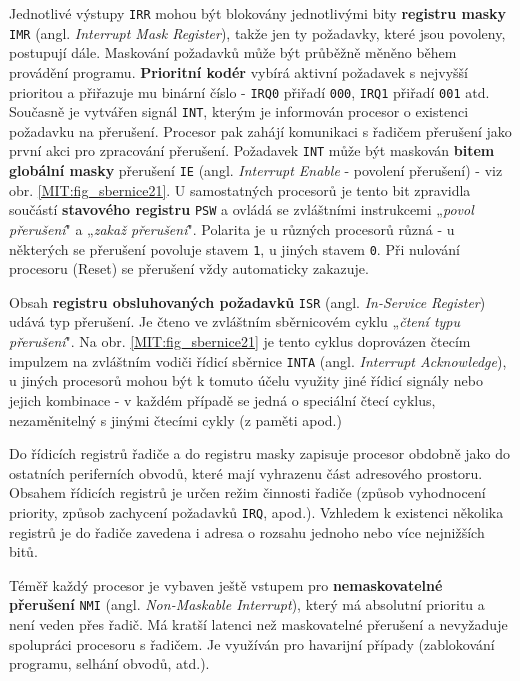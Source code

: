       Jednotlivé výstupy \texttt{IRR} mohou být blokovány jednotlivými bity \textbf{registru masky} 
      \texttt{IMR} (angl. \emph{Interrupt Mask Register}), takže jen ty požadavky, které jsou 
      povoleny, postupují dále. Maskování požadavků může být průběžně měněno během provádění 
      programu. \textbf{Prioritní kodér} vybírá aktivní požadavek s nejvyšší prioritou a přiřazuje 
      mu binární číslo - \texttt{IRQ0} přiřadí \texttt{000}, \texttt{IRQ1} přiřadí \texttt{001} 
      atd. Současně je vytvářen signál \texttt{INT}, kterým je informován procesor o existenci 
      požadavku na přerušení. Procesor pak zahájí komunikaci s řadičem přerušení jako první akci 
      pro zpracování přerušení. Požadavek \texttt{INT} může být maskován \textbf{bitem globální 
      masky} přerušení \texttt{IE} (angl. \emph{Interrupt Enable} - povolení přerušení) - viz obr. 
      \ref{MIT:fig_sbernice21}. U samostatných procesorů je tento bit zpravidla součástí 
      \textbf{stavového registru} \texttt{PSW} a ovládá se zvláštními instrukcemi „\emph{povol 
      přerušení}" a „\emph{zakaž přerušení}". Polarita je u různých procesorů různá - u některých 
      se přerušení povoluje stavem \texttt{1}, u jiných stavem \texttt{0}. Při nulování procesoru 
      (Reset) se přerušení vždy automaticky zakazuje.
      
      Obsah \textbf{registru obsluhovaných požadavků} \texttt{ISR} (angl. \emph{In-Service 
      Register}) udává typ přerušení. Je čteno ve zvláštním sběrnicovém cyklu „\emph{čtení typu 
      přerušení}". Na obr. \ref{MIT:fig_sbernice21} je tento cyklus doprovázen čtecím impulzem na 
      zvláštním vodiči řídicí sběrnice \texttt{INTA} (angl. \emph{Interrupt Acknowledge}), u jiných 
      procesorů mohou být k tomuto účelu využity jiné řídicí signály nebo jejich kombinace - v 
      každém případě se jedná o speciální čtecí cyklus, nezaměnitelný s jinými čtecími cykly (z 
      paměti apod.)
      
      Do řídicích registrů řadiče a do registru masky zapisuje procesor obdobně jako do ostatních 
      periferních obvodů, které mají vyhrazenu část adresového prostoru. Obsahem řídicích registrů 
      je určen režim činnosti řadiče (způsob vyhodnocení priority, způsob zachycení požadavků 
      \texttt{IRQ}, apod.). Vzhledem k existenci několika registrů je do řadiče zavedena i adresa o 
      rozsahu jednoho nebo více nejnižších bitů.

      Téměř každý procesor je vybaven ještě vstupem pro \textbf{nemaskovatelné přerušení} 
      \texttt{NMI} (angl. \emph{Non-Maskable Interrupt}), který má absolutní prioritu a není veden 
      přes řadič. Má kratší latenci než maskovatelné přerušení a nevyžaduje spolupráci procesoru s 
      řadičem. Je využíván pro havarijní případy (zablokování programu, selhání obvodů, atd.).

